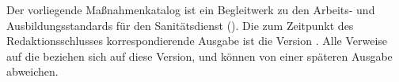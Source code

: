 \documentclass[
ngerman,
paper=a4,
asymmetric,
fontsize=9pt,
draft=false,
openany,
numbers=noenddot,
bibtotocnumbered,
footnotes=multiple,
toc=flat,
]{scrbook}
\renewcommand{\Abk}[1]{#1}
\begin{document}
% 
% 
% 
% 
% 
% 

Der vorliegende Maßnahmenkatalog ist ein Begleitwerk zu den
Arbeits- und Ausbildungsstandards für den Sanitätsdienst
(\AASS). Die zum Zeitpunkt des Redaktionsschlusses
korrespondierende Ausgabe ist die Version \VarAassVersion.
Alle Verweise auf die {\AASS} 
beziehen sich auf diese Version, und können von einer
späteren Ausgabe abweichen.
\end{document}
